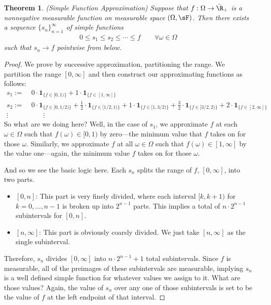 \documentclass[12pt]{article}
\theoremstyle{plain}
\newtheorem{thm}{Theorem}[section]
\theoremstyle{definition}
\theoremstyle{remark}
\newcommand{\one}[1]{\mathbf{1}_{#1}}
\newcommand{\ninf}{_{n=1}^\infty}
\begin{document}
\begin{thm}\emph{(Simple Function Approximation)}
\label{lebapprox}
Suppose that $f: \Omega\rightarrow \bar{\R}_+$ is a nonnegative
measurable function on measurable space $(\Omega,\sF)$. Then there
exists a sequence $\{s_n\}\ninf$ of simple functions
\begin{align*}
    0 \leq s_1 \leq s_2 \leq \cdots \leq f
    \qquad \forall \omega\in \Omega
\end{align*}
such that $s_n\rightarrow f$ pointwise from below.
\end{thm}
\begin{proof}
We prove by successive approximation, partitioning the range.
We partition the range $[0,\infty]$ and then construct our approximating
functions as follows:
\begin{align*}
      s_1 := &\; 0\cdot \one{\{f\in [0,1)\}}
        + 1 \cdot \one{\{f\in [1,\infty]\}} \\
      s_2 :=&\; 0\cdot \one{\{f\in [0,1/2)\}}
        + \frac{1}{2} \cdot \one{\{f\in [1/2,1)\}}
        + 1 \cdot \one{\{f\in [1,3/2)\}}
          + \frac{3}{2} \cdot \one{\{f\in [3/2,2)\}}
        + 2 \cdot \one{\{f\in [2,\infty]\}} \\
      \vdots \quad & \qquad \vdots
\end{align*}
So what are we doing here? Well, in the case of $s_1$, we approximate
$f$ at each $\omega\in\Omega$ such that $f(\omega)\in [0,1)$ by
zero---the minimum value that $f$ takes on for those $\omega$.
Similarly, we approximate $f$ at all $\omega\in \Omega$ such that
$f(\omega)\in [1,\infty]$ by the value one---again, the minimum value
$f$ takes on for those $\omega$.

And so we see the basic logic here. Each $s_n$ splits the range of $f$,
$[0,\infty]$, into two parts.
\begin{itemize}
  \item $[0,n]$: This part is very finely divided, where each interval
    $[k,k+1)$ for $k=0,\ldots,n-1$ is broken up into $2^{n-1}$ parts.
    This implies a total of $n\cdot 2^{n-1}$ subintervals for
    $[0,n]$.
  \item $[n,\infty]$: This part is obviously coarsly divided. We just
    take $[n,\infty]$ as the single subinterval.
\end{itemize}
Therefore, $s_n$ divides $[0,\infty]$ into $n\cdot 2^{n-1}+1$ total
subintervals. Since $f$ is measurable, all of the preimages of these
subintervals are measurable, implying $s_n$ is a well defined simple
function for whatever values we assign to it. What are those values?
Again, the value of $s_n$ over any one of those subintervals is set to
be the value of $f$ at the left endpoint of that interval.


\end{proof}
\end{document}

